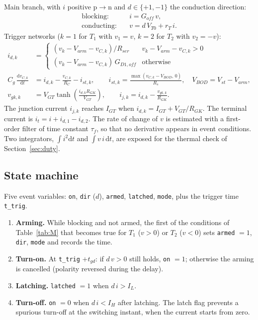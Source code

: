 \documentclass[11pt,a4paper]{article}
\begin{document}
Main branch, with $i$ positive p$\to$n and $d \in \{+1,-1\}$ the conduction direction:
\begin{align}
  \text{blocking:}& \quad i = G_{off}\, v, \\
  \text{conducting:}& \quad v = d\, V_{T0} + r_T\, i .
\end{align}
Trigger networks ($k = 1$ for $T_1$ with $v_1 = v$, $k = 2$ for $T_2$ with $v_2 = -v$):
\begin{align}
  i_{d,k} &= \begin{cases}
    (v_k - V_{arm} - v_{C,k})/R_{ser} & v_k - V_{arm} - v_{C,k} > 0 \\
    (v_k - V_{arm} - v_{C,k})\, G_{D1,off} & \text{otherwise}
  \end{cases} \\
  C_g\,\frac{\mathrm{d}v_{C,k}}{\mathrm{d}t} &= i_{d,k} - \frac{v_{C,k}}{R_C} - i_{st,k},
  \qquad i_{st,k} = \frac{\max(v_{C,k} - V_{BOD},\,0)}{R_s}, \quad V_{BOD} = V_{st} - V_{arm}, \\
  v_{gk,k} &= V_{GT}\tanh\!\left(\frac{i_{d,k} R_{GK}}{V_{GT}}\right), \qquad
  i_{j,k} = i_{d,k} - \frac{v_{gk,k}}{R_{GK}} .
\end{align}
The junction current $i_{j,k}$ reaches $I_{GT}$ when $i_{d,k} = I_{GT} + V_{GT}/R_{GK}$.
The terminal current is $i_t = i + i_{d,1} - i_{d,2}$. The rate of change of $v$ is estimated
with a first-order filter of time constant $\tau_f$, so that no derivative appears in event
conditions. Two integrators, $\int i^2 \mathrm{d}t$ and $\int v\,i\,\mathrm{d}t$, are exposed
for the thermal check of Section~\ref{sec:duty}.

\subsection{State machine}

Five event variables: \texttt{on}, \texttt{dir} ($d$), \texttt{armed}, \texttt{latched},
\texttt{mode}, plus the trigger time \texttt{t\_trig}.

\begin{enumerate}
\item \textbf{Arming.} While blocking and not armed, the first of the conditions of
      Table~\ref{tab:M} that becomes true for $T_1$ ($v > 0$) or $T_2$ ($v < 0$) sets
      \texttt{armed} $= 1$, \texttt{dir}, \texttt{mode} and records the time.
\item \textbf{Turn-on.} At \texttt{t\_trig} $+ t_{gd}$: if $d\,v > 0$ still holds, \texttt{on} $=1$;
      otherwise the arming is cancelled (polarity reversed during the delay).
\item \textbf{Latching.} \texttt{latched} $= 1$ when $d\,i > I_L$.
\item \textbf{Turn-off.} \texttt{on} $= 0$ when $d\,i < I_H$ after latching. The latch flag
      prevents a spurious turn-off at the switching instant, when the current starts from zero.
\end{enumerate}
\end{document}
